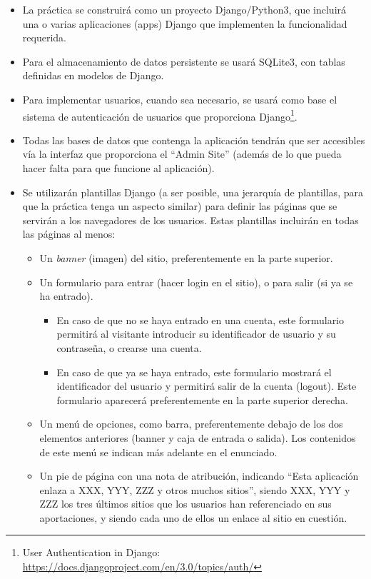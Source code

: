 \begin{itemize}

\item La práctica se construirá como un proyecto Django/Python3, que incluirá una o varias aplicaciones (apps) Django que implementen la funcionalidad requerida.

\item Para el almacenamiento de datos persistente se usará SQLite3, con tablas definidas en modelos de Django.

\item Para implementar usuarios, cuando sea necesario, se usará como base el sistema de autenticación de usuarios que proporciona Django\footnote{User Authentication in Django:\\ \url{https://docs.djangoproject.com/en/3.0/topics/auth/}}.

\item Todas las bases de datos que contenga la aplicación tendrán que ser accesibles vía la interfaz que proporciona el ``Admin Site'' (además de lo que pueda hacer falta para que funcione al aplicación).

\item Se utilizarán plantillas Django (a ser posible, una jerarquía de plantillas, para que la práctica tenga un aspecto similar) para definir las páginas que se servirán a los navegadores de los usuarios. Estas plantillas incluirán en todas las páginas al menos:

  \begin{itemize}
  \item Un \emph{banner} (imagen) del sitio, preferentemente en la parte superior.
  \item Un formulario para entrar (hacer login en el sitio), o para salir (si ya se ha entrado).
    \begin{itemize}
    \item En caso de que no se haya entrado en una cuenta, este formulario permitirá al visitante introducir su identificador de usuario y su contraseña, o crearse una cuenta.
    \item En caso de que ya se haya entrado, este formulario mostrará el identificador del usuario y permitirá salir de la cuenta (logout). Este formulario aparecerá preferentemente en la parte superior derecha.
    \end{itemize}
  \item Un menú de opciones, como barra, preferentemente debajo de los dos elementos anteriores (banner y caja de entrada o salida). Los contenidos de este menú se indican más adelante en el enunciado.
  \item Un pie de página con una nota de atribución, indicando ``Esta aplicación enlaza a XXX, YYY, ZZZ y otros muchos sitios'', siendo XXX, YYY y ZZZ los tres últimos sitios que los usuarios han referenciado en sus aportaciones, y siendo cada uno de ellos un enlace al sitio en cuestión.
  \end{itemize}


\end{itemize}
